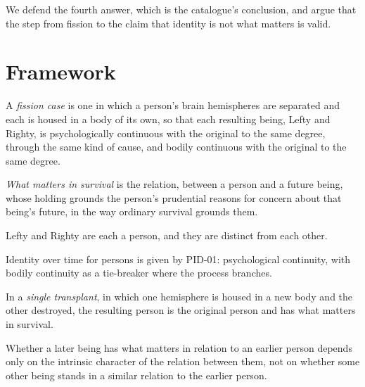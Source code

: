 \documentclass{situationist-preprint}
\begin{document}
We defend the fourth answer, which is the catalogue's conclusion, and argue that the step from fission to the claim that identity is not what matters is valid.

\section{Framework}\label{s:frame}

\begin{definition}\label{d:fission}
A \emph{fission case} is one in which a person's brain hemispheres are separated and each is housed in a body of its own, so that each resulting being, Lefty and Righty, is psychologically continuous with the original to the same degree, through the same kind of cause, and bodily continuous with the original to the same degree.
\end{definition}

\begin{definition}\label{d:matters}
\emph{What matters in survival} is the relation, between a person and a future being, whose holding grounds the person's prudential reasons for concern about that being's future, in the way ordinary survival grounds them.
\end{definition}

\begin{assumption}\label{a:persons}
Lefty and Righty are each a person, and they are distinct from each other.
\end{assumption}

\begin{assumption}\label{a:criterion}
Identity over time for persons is given by PID-01: psychological continuity, with bodily continuity as a tie-breaker where the process branches.
\end{assumption}

\begin{assumption}\label{a:single}
In a \emph{single transplant}, in which one hemisphere is housed in a new body and the other destroyed, the resulting person is the original person and has what matters in survival.
\end{assumption}

\begin{assumption}\label{a:intrinsic}
Whether a later being has what matters in relation to an earlier person depends only on the intrinsic character of the relation between them, not on whether some other being stands in a similar relation to the earlier person.
\end{assumption}
\end{document}
